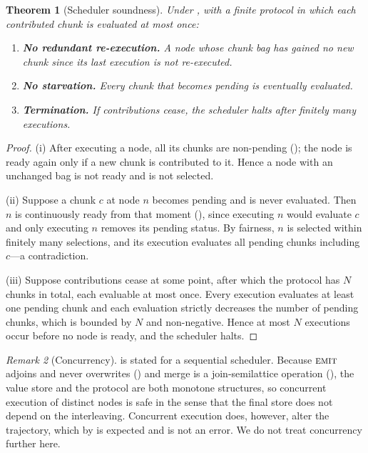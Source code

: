 \documentclass[11pt,a4paper]{article}
\theoremstyle{thmstyle}
\newtheorem{theorem}{Theorem}[section]
\theoremstyle{definition}
\theoremstyle{remark}
\newtheorem{remark}[theorem]{Remark}
\newcommand{\Node}{n}
\newcommand{\emit}{\textsc{emit}}
\begin{document}
\begin{theorem}[Scheduler soundness]
\label{thm:scheduler}
Under , with a finite protocol in which each contributed
chunk is evaluated at most once:
\begin{enumerate}[label=\textup{(\roman*)},leftmargin=2.2em]
\item \textbf{No redundant re-execution.} A node whose chunk bag has gained
no new chunk since its last execution is not re-executed.
\item \textbf{No starvation.} Every chunk that becomes pending is eventually
evaluated.
\item \textbf{Termination.} If contributions cease, the scheduler halts
after finitely many executions.
\end{enumerate}
\end{theorem}

\begin{proof}
(i) After executing a node, all its chunks are non-pending
(); the node is ready again only if a new chunk is
contributed to it. Hence a node with an unchanged bag is not ready and is
not selected.

(ii) Suppose a chunk $c$ at node $\Node$ becomes pending and is never
evaluated. Then $\Node$ is continuously ready from that moment
(), since executing $\Node$ would evaluate $c$ and only
executing $\Node$ removes its pending status. By fairness, $\Node$ is
selected within finitely many selections, and its execution evaluates all
pending chunks including $c$---a contradiction.

(iii) Suppose contributions cease at some point, after which the protocol
has $N$ chunks in total, each evaluable at most once. Every execution
evaluates at least one pending chunk and each evaluation strictly decreases
the number of pending chunks, which is bounded by $N$ and non-negative.
Hence at most $N$ executions occur before no node is ready, and the
scheduler halts.
\end{proof}

\begin{remark}[Concurrency]
\label{rem:concurrency}
 is stated for a sequential scheduler. Because $\emit$
adjoins and never overwrites () and merge is a
join-semilattice operation (), the value store
and the protocol are both monotone structures, so concurrent execution of
distinct nodes is safe in the sense that the final store does not depend on
the interleaving. Concurrent execution does, however, alter the trajectory,
which by  is expected and is not an error.
We do not treat concurrency further here.
\end{remark}
\end{document}
